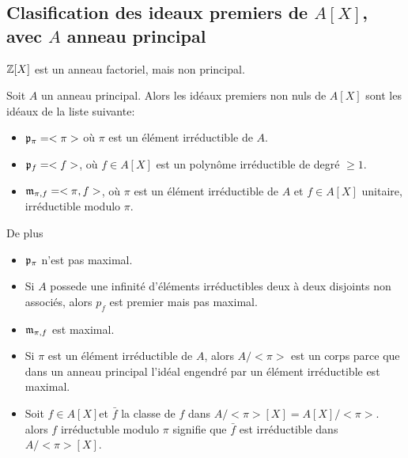 \subsection{Clasification des ideaux premiers de $A[X]$, avec $A$ anneau principal}

\begin{example}
	$\mathbb{Z}[X]$ est un anneau factoriel, mais non principal.
\end{example}

\begin{theorem}
	Soit $A$ un anneau principal. Alors les idéaux premiers non nuls de $A[X]$ sont les idéaux de la liste suivante:
	\begin{itemize}
		\item $\mathfrak{p}_{\pi} = <\pi>$ où $\pi$ est un élément irréductible de $A$. %
		\item $\mathfrak{p}_f = <f>$, où $f \in A[X]$ est un polynôme irréductible de degré $\geq 1$.
		\item $\mathfrak{m}_{\pi,f} = <\pi,f>$, où $\pi$ est un élément irréductible de $A$ et $f \in A[X]$ unitaire, irréductible modulo $\pi$.
	\end{itemize}
	De plus
	\begin{itemize}
		\item $\mathfrak{p}_{\pi}$ n'est pas maximal.
		\item Si $A$ possede une infinité d'éléments irréductibles deux à deux disjoints non associés, alors $p_f$ est premier mais pas maximal.
		\item $\mathfrak{m}_{\pi,f}$ est maximal.
	\end{itemize}
\end{theorem}


\begin{rappel}[Irréductibilité]
	\begin{itemize}
		\item
		      Si $\pi$ est un élément irréductible de $A$, alors $A/<\pi>$ est un corps parce que dans un anneau
		      principal l'idéal engendré par un élément irréductible est maximal.\\
		\item Soit  $f \in A[X]$et $\bar{f}$ la classe de $f$ dans $A/<\pi>[X] = A[X]/<\pi>$.\\
		      alors $f$ irréductuble modulo $\pi$ signifie que $\bar{f}$ est irréductible dans $A/<\pi>[X]$.
	\end{itemize}
\end{rappel}


